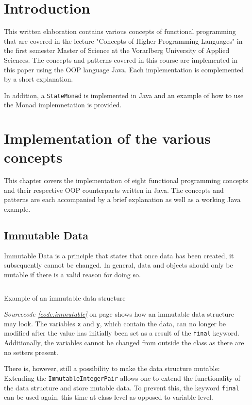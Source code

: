 \documentclass[a4paper,12pt,twoside]{scrreprt}
\begin{document}
\cleardoublepage
{}
\chapter{Introduction}
This written elaboration contains various concepts of functional programming that are covered in the lecture "Concepts of Higher Programming Languages" in the first semester Master of Science at the Vorarlberg University of Applied Sciences. The concepts and patterns covered in this course are implemented in this paper using the \ac{OOP} language Java. Each implementation is complemented by a short explanation.

In addition, a \texttt{StateMonad} is implemented in Java and an example of how to use the Monad implemnetation is provided.

\chapter{Implementation of the various concepts}
This chapter covers the implementation of eight functional programming concepts and their respective \acs{OOP} counterparts written in Java. The concepts and patterns are each accompanied by a brief explanation as well as a working Java example.

\section{Immutable Data}
Immutable Data is a principle that states that once data has been created, it subsequently cannot be changed. In general, data and objects should only be mutable if there is a valid reason for doing so.

\begin{listing}[ht]
    \inputminted[fontsize=\footnotesize,linenos]{java}{./code/ImmutableIntegerPair.java}
    \caption[Example of an immutable data structure]{Example of an immutable data structure}
    \label{code:immutable}
\end{listing}

\emph{Sourcecode \ref{code:immutable}} on page \pageref{code:immutable} shows how an immutable data structure may look. The variables \texttt{x} and \texttt{y}, which contain the data, can no longer be modified after the value has initially been set as a result of the \texttt{final} keyword. Additionally, the variables cannot be changed from outside the class as there are no setters present.

There is, however, still a possibility to make the data structure mutable: Extending the \texttt{ImmutableIntegerPair} allows one to extend the functionality of the data structure and store mutable data. To prevent this, the keyword \texttt{final} can be used again, this time at class level as opposed to variable level.
\end{document}
